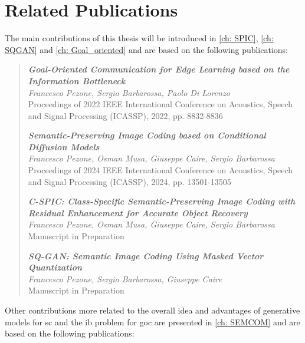 \section{Related Publications}
The main contributions of this thesis will be introduced in \cref{ch: SPIC}, \ref{ch: SQGAN} and \ref{ch: Goal_oriented} and are based on the following publications:
\begin{quotation}
\noindent \textit{\textbf{\large Goal-Oriented Communication for Edge Learning based on the Information Bottleneck}}\\
\textit{Francesco Pezone, Sergio Barbarossa, Paolo Di Lorenzo}\\
Proceedings of 2022 IEEE International Conference on Acoustics, Speech and Signal Processing (ICASSP), 2022, pp. 8832-8836


\vspace{0.2cm}

\noindent \textit{\textbf{\large Semantic-Preserving Image Coding based on Conditional Diffusion Models}}\\
\textit{Francesco Pezone, Osman Musa, Giuseppe Caire, Sergio Barbarossa}\\
Proceedings of 2024 IEEE International Conference on Acoustics, Speech and Signal Processing (ICASSP), 2024, pp. 13501-13505

\vspace{0.2cm}

\noindent \textit{\textbf{\large C-SPIC: Class-Specific Semantic-Preserving Image Coding with Residual Enhancement for Accurate Object Recovery}}\\
\textit{Francesco Pezone, Osman Musa, Giuseppe Caire, Sergio Barbarossa}\\
Manuscript in Preparation 

\vspace{0.2cm}

\noindent \textit{\textbf{\large SQ-GAN: Semantic Image Coding Using
Masked Vector Quantization}}\\
\textit{Francesco Pezone, Sergio Barbarossa, Giuseppe Caire}\\
Manuscript in Preparation
\end{quotation}
\noindent Other contributions more related to the overall idea and advantages of generative models for \gls{sc} and the \gls{ib} problem for \gls{goc} are presented in \cref{ch: SEMCOM} and are based on the following publications:
